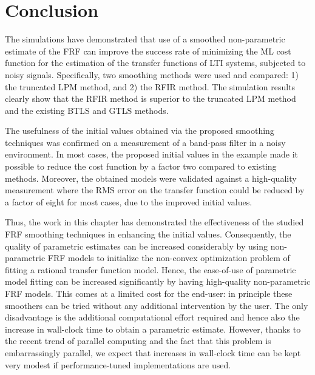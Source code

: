 \section{Conclusion}\label{se:Conclusion}
The simulations have demonstrated that use of a smoothed non-parametric estimate of the \gls{FRF} can improve the success rate of minimizing the \gls{ML} cost function for the estimation of the transfer functions of \gls{LTI} systems, subjected to noisy signals. Specifically, two smoothing methods were used and compared: 1) the truncated \gls{LPM} method, and 2) the \gls{RFIR} method. The simulation results clearly show that the \gls{RFIR} method is superior to the truncated \gls{LPM} method and the existing \gls{BTLS} and \gls{GTLS} methods.

The usefulness of the initial values obtained via the proposed smoothing techniques was confirmed on a measurement of a band-pass filter in a noisy environment.
In most cases, the proposed initial values in the example made it possible to reduce the cost function by a factor two compared to existing methods.
Moreover, the obtained models were validated against a high-quality measurement where the \gls{RMS} error on the transfer function could be reduced by a factor of eight for most cases, due to the improved initial values.

Thus, the work in this chapter has demonstrated the effectiveness of the studied \gls{FRF} smoothing techniques in enhancing the initial values.
Consequently, the quality of parametric estimates can be increased considerably by using non-parametric \gls{FRF} models to initialize the non-convex optimization problem of fitting a rational transfer function model.
Hence, the ease-of-use of parametric model fitting can be increased significantly by having high-quality non-parametric \gls{FRF} models.
This comes at a limited cost for the end-user: in principle these smoothers can be tried without any additional intervention by the user.
The only disadvantage is the additional computational effort required and hence also the increase in wall-clock time to obtain a parametric estimate.
However, thanks to the recent trend of parallel computing and the fact that this problem is embarrassingly parallel, we expect that increases in wall-clock time can be kept very modest if performance-tuned implementations are used.
